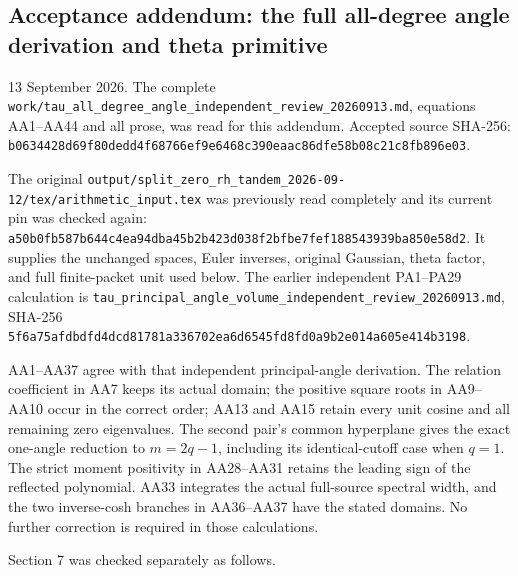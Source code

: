 \subsection{Acceptance addendum: the full all-degree angle derivation and theta primitive}\label{endpoint-angle_primitive_acceptance--acceptance-addendum-the-full-all-degree-angle-derivation-and-theta-primitive}

13 September 2026. The complete \nolinkurl{work/tau_all_degree_angle_independent_review_20260913.md}, equations AA1--AA44 and all prose, was read for this addendum. Accepted source SHA-256: \nolinkurl{b0634428d69f80dedd4f68766ef9e6468c390eaac86dfe58b08c21c8fb896e03}.

The original \nolinkurl{output/split_zero_rh_tandem_2026-09-12/tex/arithmetic_input.tex} was previously read completely and its current pin was checked again: \nolinkurl{a50b0fb587b644c4ea94dba45b2b423d038f2bfbe7fef188543939ba850e58d2}. It supplies the unchanged spaces, Euler inverses, original Gaussian, theta factor, and full finite-packet unit used below. The earlier independent PA1--PA29 calculation is \nolinkurl{tau_principal_angle_volume_independent_review_20260913.md}, SHA-256 \nolinkurl{5f6a75afdbdfd4dcd81781a336702ea6d6545fd8fd0a9b2e014a605e414b3198}.

AA1--AA37 agree with that independent principal-angle derivation. The relation coefficient in AA7 keeps its actual domain; the positive square roots in AA9--AA10 occur in the correct order; AA13 and AA15 retain every unit cosine and all remaining zero eigenvalues. The second pair's common hyperplane gives the exact one-angle reduction to \(m=2q-1\), including its identical-cutoff case when \(q=1\). The strict moment positivity in AA28--AA31 retains the leading sign of the reflected polynomial. AA33 integrates the actual full-source spectral width, and the two inverse-cosh branches in AA36--AA37 have the stated domains. No further correction is required in those calculations.

Section 7 was checked separately as follows.

